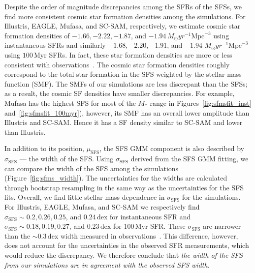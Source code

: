 \documentclass[preprint2,tighten]{aastex62}
\newcommand{\todo}[1]{{\bf \textcolor{red}{ #1}}}
\begin{document}
Despite the order of magnitude discrepancies among the SFRs of the SFSs,
we find more consistent cosmic star formation densities among the 
simulations. For Illustris, EAGLE, {\sc Mufasa}, and SC-SAM, respectively, 
we estimate cosmic star formation densities of 
$-1.66, -2.22, -1.87$, and $-1.94\,M_\odot yr^{-1} \mathrm{Mpc}^{-3}$ 
using instantaneous SFRs and similarly 
$-1.68, -2.20, -1.91$, and $-1.94$ $M_\odot yr^{-1} \mathrm{Mpc}^{-3}$ 
using $100\,\mathrm{Myr}$ SFRs. In fact, these star formation densities
are more or less consistent with observations~\citep{madau2014}. 
{\color{red}
The cosmic star formation densities roughly correspond to the total 
star formation in the SFS weighted by the stellar mass function (SMF).
The SMFs of our simulations are less discrepant than the SFSs; as
a result, the cosmic SF densities have smaller discrepancies.
For example, {\sc Mufasa} has the highest SFS for most of the 
$M_*$ range in Figures~\ref{fig:sfmsfit_inst} and~\ref{fig:sfmsfit_100myr}), 
however, its SMF has an overall lower amplitude than Illustris and 
SC-SAM. Hence it has a SF density similar to SC-SAM and lower than 
Illustris.}

In addition to its position, $\mu_\mathrm{SFS}$, the SFS GMM component 
is also described by $\sigma_\mathrm{SFS}$ --- the width of the SFS. 
Using $\sigma_\mathrm{SFS}$ derived from the SFS GMM fitting, 
we can compare the width of the SFS among the simulations 
(Figure~\ref{fig:sfms_width}). The uncertainties for the widths are 
calculated through bootstrap resampling in the same way as the 
uncertainties for the SFS fits. Overall, we find little stellar mass 
dependence in $\sigma_\mathrm{SFS}$ for the simulations. For Illustris, 
EAGLE, {\sc Mufasa}, and SC-SAM we respectively find 
$\sigma_\mathrm{SFS} \sim 0.2, 0.26, 0.25$, and $0.24\,\mathrm{dex}$ 
for instantaneous SFR and
$\sigma_\mathrm{SFS} \sim 0.18, 0.19, 0.27$, and $0.23\,\mathrm{dex}$
for $100\,\mathrm{Myr}$ SFR. These $\sigma_\mathrm{SFS}$ are narrower 
than the ${\sim}0.3\,\mathrm{dex}$ width measured in 
observations~\citep[\emph{e.g.}][]{daddi2007, noeske2007, magdis2012, whitaker2012}. 
This difference, however, does not account for the uncertainties in the 
observed SFR measurements, which would reduce the discrepancy. We 
therefore conclude that \emph{the width of the SFS from our 
simulations are in agreement with the observed SFS width.}
\end{document}
